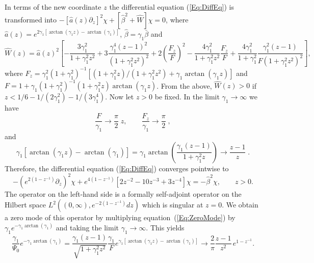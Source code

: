 \documentclass[           %
               showpacs,            %
               preprintnumbers,     %
               aps,                 %
               prd,                 %
               superscriptaddress,      %
               nofootinbib,         %
               tightenlines,        %
               floats,floatfix      %
               ]{revtex4}
\begin{document}
In terms of the new coordinate $z$ the differential equation
(\ref{Eq:DiffEq}) is transformed into $-[\hat{a}(z)\partial_z]^2\chi +
[\hat{\beta}^2 + \hat{W}]\chi = 0$, where $\hat{a}(z) =
e^{2\gamma_1[\arctan(\gamma_1 z) - \arctan(\gamma_1)]}$, $\hat{\beta} =
\gamma_1\bar{\beta}$ and
\begin{displaymath}
\hat{W}(z) = \hat{a}(z)^2\left[  
 -\frac{3\gamma_1^2}{1+\gamma_1^2 z^2} 
 + 3\frac{\gamma_1^4(z-1)^2}{(1+\gamma_1^2 z^2)^2} 
 + 2\left( \frac{F_z}{F} \right)^2 
 - \frac{4\gamma_1^2}{1+\gamma_1^2 z^2}\frac{F_z}{F}
 + \frac{4\gamma_1^2}{1+\gamma_1^2}
   \frac{\gamma_1^2(z-1)}{F(1+\gamma_1^2 z^2)^2} \right],
\end{displaymath}
where $F_z = \gamma_1^2(1+\gamma_1^2)^{-1} [ (1+\gamma_1^2
 z)/(1+\gamma_1^2 z^2) + \gamma_1\arctan(\gamma_1 z)]$ and $F = 1 +
 \gamma_1(1+\gamma_1^2)^{-1}(1 + \gamma_1^2 z)\arctan(\gamma_1
 z)$. From the above, $\hat{W}(z) > 0$ if $z < 1/6 - 1/(2\gamma_1^2) -
 1/(3\gamma_1^4)$. Now let $z > 0$ be fixed. In the limit
 $\gamma_1\to\infty$ we have
\begin{displaymath}
\frac{F}{\gamma_1} \to \frac{\pi}{2}\; z, \qquad
\frac{F_z}{\gamma_1} \to \frac{\pi}{2}\; ,
\end{displaymath}
and
\begin{displaymath}
\gamma_1[\arctan(\gamma_1 z) - \arctan(\gamma_1)] 
 = \gamma_1\arctan\left( \frac{\gamma_1(z-1)}{1 + \gamma_1^2 z} \right)
 \to \frac{z-1}{z}\; .
\end{displaymath}
Therefore, the differential equation (\ref{Eq:DiffEq}) converges
pointwise to
\begin{equation}
-\left( e^{2(1-z^{-1})}\partial_z \right)^2 \chi
 +  e^{4(1-z^{-1})}\left[ 2 z^{-2} - 10 z^{-3} + 3 z^{-4} \right]\chi
 = -\hat{\beta}^2\chi, \qquad z > 0.
\label{Eq:DiffEqLargeGamma}
\end{equation}
The operator on the left-hand side is a formally self-adjoint operator
on the Hilbert space $L^2( (0,\infty), e^{-2(1-z^{-1})}dz)$ which is
singular at $z=0$. We obtain a zero mode of this operator by
multiplying equation~(\ref{Eq:ZeroMode}) by $\gamma_1
e^{-\gamma_1\arctan(\gamma_1)}$ and taking the limit $\gamma_1\to
\infty$. This yields
\begin{equation}
\frac{\gamma_1}{\Psi_0} e^{-\gamma_1\arctan(\gamma_1)} 
 = \frac{\gamma_1(z-1)}{\sqrt{1 + \gamma_1^2 z^2}}\frac{\gamma_1}{F}
   e^{\gamma_1[\arctan(\gamma_1 z) - \arctan(\gamma_1)]}
 \to \frac{2}{\pi}\frac{z-1}{z^2}\, e^{1 - z^{-1}}.
\label{Eq:ZeroModeLargeGamma}
\end{equation}
\end{document}
